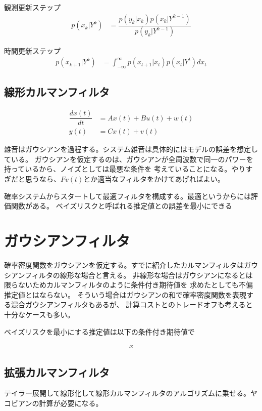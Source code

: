 観測更新ステップ
\begin{align}
p(x_k|Y^k)
&=
\dfrac{p(y_k|x_k)p(x_k|Y^{k-1})}{p(y_k|Y^{k-1})}
\end{align}



時間更新ステップ
\begin{align}
p(x_{k+1}|Y^k)
&=
\int_{-\infty}^\infty
p(x_{t+1}|x_t) p(x_t|Y^t)dx_t
\end{align}







\subsection{線形カルマンフィルタ}

\begin{align}
\dfrac{dx(t)}{dt}&=Ax(t)+Bu(t)+w(t) 			\\
y(t)&=Cx(t) + v(t)
\end{align}

雑音はガウシアンを過程する。システム雑音は具体的にはモデルの誤差を想定している。
ガウシアンを仮定するのは、ガウシアンが全周波数で同一のパワーを持っているから、ノイズとしては最悪な条件を
考えていることになる。やりすぎだと思うなら、$Fv(t)$とか適当なフィルタをかけてあげればよい。

確率システムからスタートして最適フィルタを構成する。最適というからには評価関数がある。
ベイズリスクと呼ばれる推定値との誤差を最小にできる



\section{ガウシアンフィルタ}
確率密度関数をガウシアンを仮定する。すでに紹介したカルマンフィルタはガウシアンフィルタの線形な場合と言える。
非線形な場合はガウシアンになるとは限らないためカルマンフィルタのように条件付き期待値を
求めたとしても不偏推定値とはならない。
そういう場合はガウシアンの和で確率密度関数を表現する混合ガウシアンフィルタもあるが、
計算コストとのトレードオフも考えると十分なケースも多い。

ベイズリスクを最小にする推定値は以下の条件付き期待値で

\begin{align}
x
\end{align}

\subsection{拡張カルマンフィルタ}
テイラー展開して線形化して線形カルマンフィルタのアルゴリズムに乗せる。ヤコビアンの計算が必要になる。


